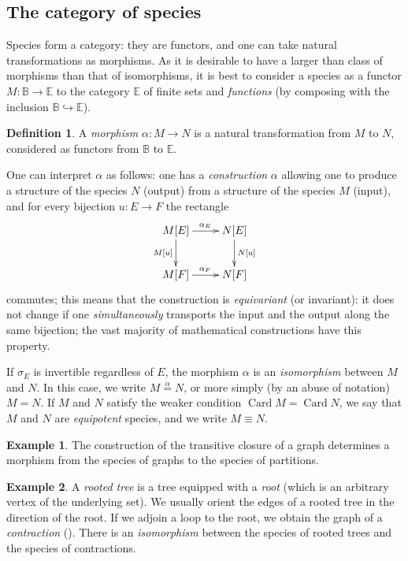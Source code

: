 \documentclass{article}
\theoremstyle{definition}
\newtheorem{defn}[thm]{Definition}
\newtheorem{ex}{Example}
\theoremstyle{remark}
\newcommand{\B}{\mathbb{B}}
\newcommand{\E}{\mathbb{E}}
\newcommand{\inj}{\hookrightarrow}
\DeclareMathOperator{\Card}{Card}
\newcommand{\pref}[1]{\prettyref{#1}}
\begin{document}
\subsection{The category of species}

Species form a category: they are functors, and one can take natural
transformations as morphisms. As it is desirable to have a larger than
class of morphisms than that of isomorphisms, it is best to consider a
species as a functor $M: \B \to \E$ to the category $\E$ of finite sets
and \emph{functions} (by composing with the inclusion $\B \inj \E$).

\begin{defn}
  A \emph{morphism} $\alpha : M \to N$ is a natural transformation
  from $M$ to $N$, considered as functors from $\B$ to $\E$.
\end{defn}

One can interpret $\alpha$ as follows: one has a \emph{construction}
$\alpha$ allowing one to produce a structure of the species $N$
(output) from a structure of the species $M$ (input), and for every
bijection $u : E \to F$ the rectangle \[ \xymatrix{M[E]
  \ar[r]^{\alpha_E} \ar[d]_{M[u]} & N[E] \ar[d]^{N[u]} \\ M[F]
  \ar[r]^{\alpha_F} & N[F] } \] commutes; this means that the
construction is \emph{equivariant} (or invariant): it does not change
if one \emph{simultaneously} transports the input and the output along
the same bijection; the vast majority of mathematical constructions
have this property.

If $\sigma_E$ is invertible regardless of $E$, the morphism $\alpha$
is an \emph{isomorphism} between $M$ and $N$. In this case, we write
$M \stackrel{\alpha}{=} N$, or more simply (by an abuse of notation) $M
= N$. If $M$ and $N$ satisfy the weaker condition $\Card M = \Card N$,
we say that $M$ and $N$ are \emph{equipotent} species, and we write $M
\equiv N$.

\begin{ex}
  The construction of the transitive closure of a graph determines a
  morphism from the species of graphs to the species of partitions.
\end{ex}

\begin{ex}
  A \emph{rooted tree} is a tree equipped with a \emph{root} (which is
  an arbitrary vertex of the underlying set). We usually orient the
  edges of a rooted tree in the direction of the root. If we adjoin a
  loop to the root, we obtain the graph of a \emph{contraction}
  (\pref{ex:endofunctions}). There is an \emph{isomorphism} between
  the species of rooted trees and the species of contractions.
\end{ex}
\end{document}
